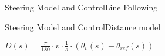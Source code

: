 \begin{frame}{Steering Model and Control}{Line Following}
  \begin{minipage}{\linewidth}
    \begin{minipage}{0.35\linewidth}
      \begin{figure}[H]
        \centering
      \end{figure}
    \end{minipage}
    \hspace{0.03\linewidth}
    \begin{minipage}{0.45\linewidth}
      \begin{figure}[H]
        \centering
      \end{figure}
    \end{minipage}
  \end{minipage}
\end{frame}


\begin{frame}{Steering Model and Control}{Distance model}

  $ D(s)= \frac{\pi}{180} \cdot v \cdot \frac{1}{s} \cdot \left(\theta_{v}(s) - \theta_{ref}(s)\right) $

  \begin{figure}[H]
    \centering
  \end{figure}
\end{frame}

